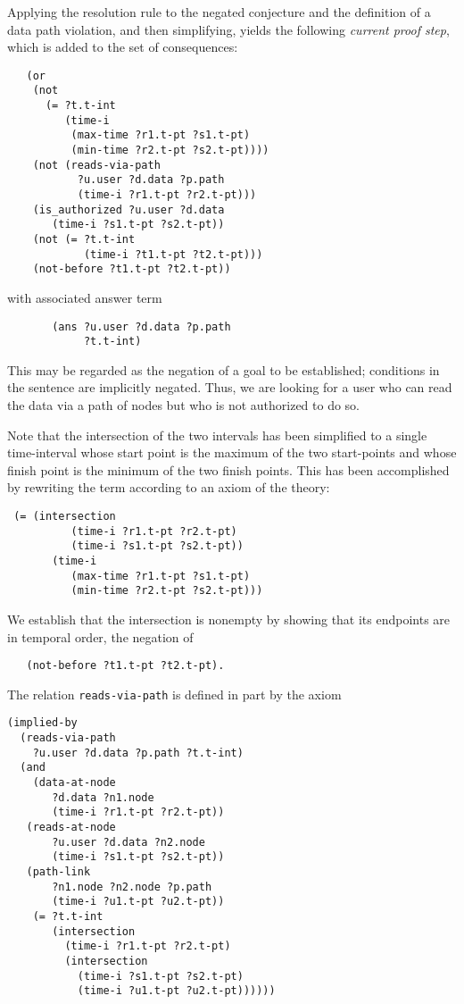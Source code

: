 Applying the resolution rule to the negated conjecture and the definition of a data path violation, and then simplifying, yields the following \textit{current proof step}, which is added to the set of consequences:

\begin{verbatim}
   (or 
    (not 
      (= ?t.t-int
         (time-i 
          (max-time ?r1.t-pt ?s1.t-pt)
          (min-time ?r2.t-pt ?s2.t-pt))))
    (not (reads-via-path
           ?u.user ?d.data ?p.path
           (time-i ?r1.t-pt ?r2.t-pt)))
    (is_authorized ?u.user ?d.data
       (time-i ?s1.t-pt ?s2.t-pt))
    (not (= ?t.t-int
            (time-i ?t1.t-pt ?t2.t-pt)))
    (not-before ?t1.t-pt ?t2.t-pt))
\end{verbatim}
with associated answer term
\begin{verbatim}
       (ans ?u.user ?d.data ?p.path
            ?t.t-int)
\end{verbatim}
This may be regarded as the negation of a goal to be established; conditions in the sentence are implicitly negated.
Thus, we are looking for a user who can read the data via a path of nodes but who is not authorized to do so.

Note that the intersection of the two intervals has been simplified to a single time-interval whose start point is the maximum of the two start-points and whose finish point is the minimum of the two finish points.  
This has been accomplished by rewriting the term according to an axiom of the theory:

\begin{verbatim}
 (= (intersection
          (time-i ?r1.t-pt ?r2.t-pt)
          (time-i ?s1.t-pt ?s2.t-pt))
       (time-i
          (max-time ?r1.t-pt ?s1.t-pt)
          (min-time ?r2.t-pt ?s2.t-pt)))
\end{verbatim}
We establish that the intersection is nonempty by showing that its endpoints are in temporal order, \ie the negation of
\begin{verbatim}
   (not-before ?t1.t-pt ?t2.t-pt).
\end{verbatim}

The relation \verb'reads-via-path' is defined in part by the axiom

\begin{verbatim}
(implied-by
  (reads-via-path
    ?u.user ?d.data ?p.path ?t.t-int)
  (and
    (data-at-node 
       ?d.data ?n1.node 
       (time-i ?r1.t-pt ?r2.t-pt))
   (reads-at-node 
       ?u.user ?d.data ?n2.node 
       (time-i ?s1.t-pt ?s2.t-pt))
   (path-link 
       ?n1.node ?n2.node ?p.path 
       (time-i ?u1.t-pt ?u2.t-pt))   
    (= ?t.t-int
       (intersection
	     (time-i ?r1.t-pt ?r2.t-pt)
	     (intersection
           (time-i ?s1.t-pt ?s2.t-pt)
           (time-i ?u1.t-pt ?u2.t-pt))))))
\end{verbatim}

